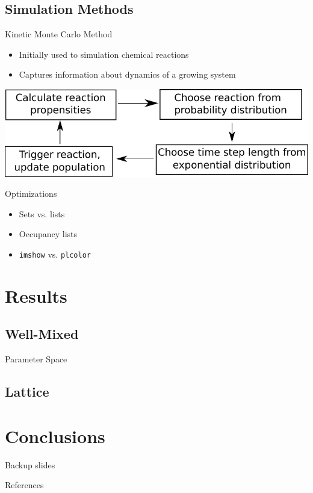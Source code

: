 \documentclass[12pt]{beamer}              %
\begin{document}
\subsection{Simulation Methods}


\begin{frame}{Kinetic Monte Carlo Method}
  \begin{itemize}
    \item Initially used to simulation chemical reactions
    \item Captures information about dynamics of a growing system
  \end{itemize}
  \vspace*{\fill}
  \centerline{\includegraphics[width=.75\paperwidth]{../../dev/graphics/poster/gillespie.pdf}}
\end{frame}


\begin{frame}[fragile]{Optimizations}
  \begin{itemize}
    \item Sets vs. lists
    \item Occupancy lists
    \item \verb|imshow| vs. \verb|plcolor| %
  \end{itemize}
\end{frame}




\section{Results}
\subsection{Well-Mixed}
\begin{frame}{Parameter Space}
\end{frame}

\subsection{Lattice}


\section{Conclusions}



\appendix

\begin{frame}[fragile]{Backup slides}
\end{frame}

\begin{frame}[allowframebreaks]{References}
  
  
\end{frame}
\end{document}
